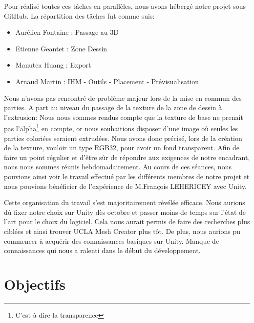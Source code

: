 \documentclass[a4paper,11pt]{article}
\begin{document}
				Pour réalisé toutes ces tâches en parallèles, nous avons hébergé notre projet sous GitHub. La répartition des tâches fut comme suis:
					\begin{itemize}

			\item	 Aurélien Fontaine : Passage au 3D
			\item	 Etienne Geantet : Zone Dessin
			\item	 Manutea Huang : Export
			\item	 Arnaud Martin : IHM - Outils - Placement - Prévisualisation
							
					\end{itemize}
				Nous n'avons pas rencontré de problème majeur lors de la mise en commun des parties. A part au niveau du passage de la texture de la zone de dessin à l'extrusion:
				 Nous nous sommes rendus compte que la texture de base ne prenait pas l'alpha\footnote{C'est à dire la transparence} en compte, or nous souhaitions disposer d'une image où seules les parties coloriées seraient extrudées. Nous avons donc précisé, lors de la création de la texture, vouloir un type RGB32, pour avoir un fond transparent.
				Afin de faire un point régulier et d'être sûr de répondre aux exigences de notre encadrant, nous nous sommes réunis hebdomadairement. Au cours de ces séances, nous pouvions ainsi voir le travail effectué par les différents membres de notre projet et nous pouvions bénéficier de l'expérience de M.François LEHERICEY avec Unity.
				
				Cette organisation du travail s'est majoritairement révélée efficace. Nous aurions dû fixer notre choix sur Unity dès octobre et passer moins de temps sur l'état de l'art pour le choix du logiciel. Cela nous aurait permis de faire des recherches plus ciblées et ainsi trouver UCLA Mesh Creator plus tôt. De plus, nous aurions pu commencer à acquérir des connaissances basiques sur Unity. Manque de connaissances qui nous a ralenti dans le début du développement.
			
	
	\section{Objectifs} 
\end{document}
